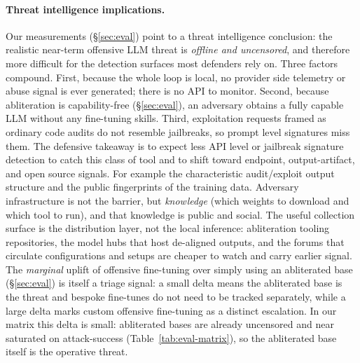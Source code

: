 \paragraph{Threat intelligence implications.}
Our measurements (\S\ref{sec:eval}) point to a
threat intelligence conclusion: the realistic near-term offensive LLM threat is
\emph{offline and uncensored}, and therefore more difficult for the
detection surfaces most defenders rely on. Three factors compound. First,
because the whole loop is local, no provider side telemetry or abuse signal is
ever generated; there is no API to monitor. Second, because
abliteration is capability-free (\S\ref{sec:eval}), an adversary obtains a fully
capable LLM without any fine-tuning skills. Third, exploitation
requests framed as ordinary code audits do not resemble jailbreaks, so
prompt level signatures miss them. The defensive takeaway is to expect less
API level or jailbreak signature detection to catch this class of tool and to
shift toward endpoint, output-artifact, and open source signals. For example the
characteristic audit/exploit output structure and the public
fingerprints of the training data. Adversary infrastructure is not the barrier, but
\emph{knowledge} (which weights to download and which tool to run), and that
knowledge is public and social. The useful collection surface is the
distribution layer, not the local inference: abliteration tooling
repositories, the model hubs that host de-aligned outputs, and the forums that
circulate configurations and setups are cheaper to watch and carry earlier
signal. The \emph{marginal} uplift of offensive
fine-tuning over simply using an abliterated base (\S\ref{sec:eval}) is itself a
triage signal: a small delta means the abliterated base is the threat and
bespoke fine-tunes do not need to be tracked separately, while a large delta marks
custom offensive fine-tuning as a distinct escalation. In our matrix this delta
is small: abliterated bases are already uncensored and
near saturated on attack-success (Table~\ref{tab:eval-matrix}), so the
abliterated base itself is the operative threat.




